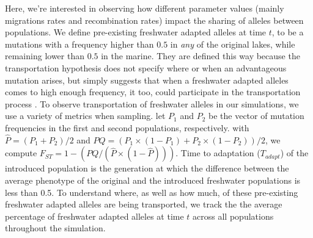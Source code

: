 \documentclass{article}
\newcommand{\plr}[1]{\todo[linecolor=blue,backgroundcolor=blue!25,bordercolor=blue]{#1}}
\begin{document}
Here, we're interested in observing how different parameter values
(mainly migrations rates and recombination rates)
impact the sharing of alleles between populations. 
We define pre-existing freshwater adapted alleles at time $t$,
to be a mutations with a frequency higher than $0.5$ in \textit{any} of the original lakes, 
while remaining lower than $0.5$ in the marine. 
They are defined this way because the transportation hypothesis does not specify where or when an advantageous mutation arises,
but simply suggests that when a freshwater adapted alleles comes to high enough frequency, it too, could participate in the transportation process \citep{schluter2009genetics}.
To observe transportation of freshwater alleles in our simulations, we use a variety of metrics when sampling.
let $P_{1}$ and $P_{2}$ be the vector of mutation frequencies in the first and second populations, respectively.
with $\hat{P} = (P_{1} + P_{2}) / 2$ and
$PQ = (P_{1} \times (1 - P_{1}) + P_{2} \times (1 - P_{2})) / 2$,
we compute $F_{ST} = 1 - (PQ / (\hat{P} \times (1 - \hat{P})))$.
Time to adaptation ($T_{adapt}$) of the introduced population is the generation at which
the difference between the average phenotype of the original and the introduced freshwater populations is less than 0.5. 
To understand where, as well as how much, of these pre-existing freshwater adapted alleles are being transported,
we track the the average percentage of freshwater adapted alleles at time $t$ across all populations throughout the simulation.
\end{document}
